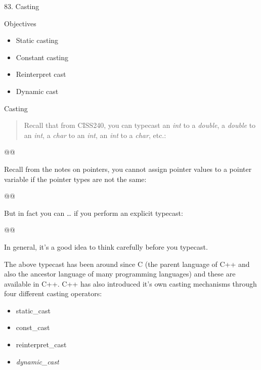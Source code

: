 \documentclass[
]{article}
\author{}
\date{}
\providecommand{\tightlist}{%
  \setlength{\itemsep}{0pt}\setlength{\parskip}{0pt}}
\begin{document}
83. Casting

Objectives

\begin{itemize}
\tightlist
\item
  Static casting
\item
  Constant casting
\item
  Reinterpret cast
\item
  Dynamic cast
\end{itemize}

Casting

\begin{quote}
\end{quote}

\begin{quote}
Recall that from CISS240, you can typecast an \emph{int} to a
\emph{double}, a \emph{double} to an \emph{int}, a \emph{char} to an
\emph{int}, an \emph{int} to a \emph{char}, etc.:
\end{quote}

\begin{longtable}[]{@{}@{}}
\toprule\noalign{}
\endhead
\bottomrule\noalign{}
\endlastfoot
\end{longtable}

Recall from the notes on pointers, you cannot assign pointer values to a
pointer variable if the pointer types are not the same:

\begin{longtable}[]{@{}@{}}
\toprule\noalign{}
\endhead
\bottomrule\noalign{}
\endlastfoot
\end{longtable}

But in fact you can \ldots{} if you perform an explicit typecast:

\begin{longtable}[]{@{}@{}}
\toprule\noalign{}
\endhead
\bottomrule\noalign{}
\endlastfoot
\end{longtable}

In general, it's a good idea to think carefully before you typecast.

The above typecast has been around since C (the parent language of C++
and also the ancestor language of many programming languages) and these
are available in C++. C++ has also introduced it's own casting
mechanisms through four different casting operators:

\begin{itemize}
\tightlist
\item
  static\_cast
\item
  const\_cast
\item
  reinterpret\_cast
\item
  \emph{dynamic\_cast}
\end{itemize}
\end{document}
